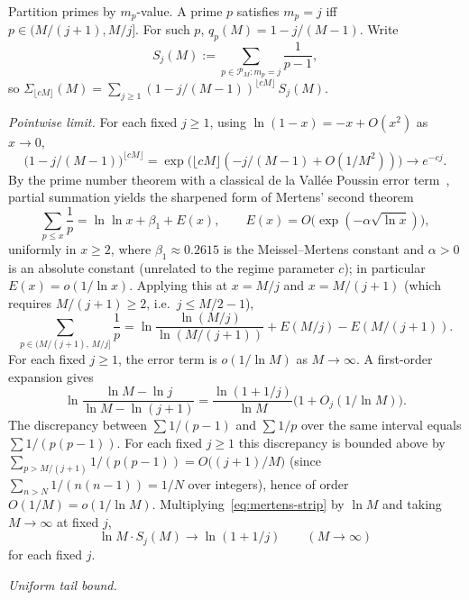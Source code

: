 \documentclass[11pt]{article}
\theoremstyle{remark}
\newcommand{\PM}{\mathcal{P}_M}
\begin{document}
Partition primes by $m_p$-value. A prime $p$ satisfies $m_p = j$ iff $p \in (M/(j+1), M/j]$. For such $p$, $q_p(M) = 1 - j/(M-1)$. Write
\[
S_j(M) := \sum_{p \in \PM \colon m_p = j} \frac{1}{p-1},
\]
so $\Sigma_{\lfloor cM \rfloor}(M) = \sum_{j \geq 1}(1 - j/(M-1))^{\lfloor cM \rfloor}\, S_j(M)$.

\emph{Pointwise limit.} For each fixed $j \geq 1$, using $\ln(1 - x) = -x + O(x^2)$ as $x \to 0$,
\[
\bigl(1 - j/(M-1)\bigr)^{\lfloor cM \rfloor} = \exp\bigl(\lfloor cM \rfloor(-j/(M-1) + O(1/M^2))\bigr) \longrightarrow e^{-cj}.
\]
By the prime number theorem with a classical de la Vall\'ee Poussin error term~\cite[Ch.~I.3]{Tenenbaum2015}, partial summation yields the sharpened form of Mertens' second theorem
\[
\sum_{p \leq x} \frac{1}{p} = \ln \ln x + \beta_1 + E(x), \qquad E(x) = O\bigl(\exp(-\alpha\sqrt{\ln x})\bigr),
\]
uniformly in $x \geq 2$, where $\beta_1 \approx 0.2615$ is the Meissel--Mertens constant and $\alpha > 0$ is an absolute constant (unrelated to the regime parameter $c$); in particular $E(x) = o(1/\ln x)$. Applying this at $x = M/j$ and $x = M/(j+1)$ (which requires $M/(j+1) \geq 2$, i.e.\ $j \leq M/2 - 1$),
\begin{equation}\label{eq:mertens-strip}
\sum_{p \in (M/(j+1),\, M/j]} \frac{1}{p} = \ln\!\frac{\ln(M/j)}{\ln(M/(j+1))} + E(M/j) - E(M/(j+1)).
\end{equation}
For each fixed $j \geq 1$, the error term is $o(1/\ln M)$ as $M \to \infty$. A first-order expansion gives
\[
\ln\!\frac{\ln M - \ln j}{\ln M - \ln(j+1)} = \frac{\ln(1 + 1/j)}{\ln M}\bigl(1 + O_j(1/\ln M)\bigr).
\]
The discrepancy between $\sum 1/(p-1)$ and $\sum 1/p$ over the same interval equals $\sum 1/(p(p-1))$. For each fixed $j \geq 1$ this discrepancy is bounded above by $\sum_{p > M/(j+1)} 1/(p(p-1)) = O\bigl((j+1)/M\bigr)$ (since $\sum_{n > N} 1/(n(n-1)) = 1/N$ over integers), hence of order $O(1/M) = o(1/\ln M)$. Multiplying~\eqref{eq:mertens-strip} by $\ln M$ and taking $M \to \infty$ at fixed $j$,
\begin{equation}\label{eq:Sj-pointwise}
\ln M \cdot S_j(M) \longrightarrow \ln(1 + 1/j) \qquad (M \to \infty)
\end{equation}
for each fixed $j$.

\emph{Uniform tail bound.}
\end{document}
